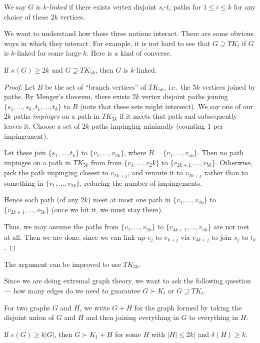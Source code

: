\documentclass[a4paper]{article}
\begin{document}
\begin{defi}
  We say $G$ is \emph{$k$-linked} if there exists vertex disjoint $s_i$-$t_i$ paths for $1 \leq i \leq k$ for any choice of these $2k$ vertices.
\end{defi}

We want to understand how these three notions interact. There are some obvious ways in which they interact. For example, it is not hard to see that $G \supseteq TK_t$ if $G$ is $k$-linked for some large $k$. Here is a kind of converse.
\begin{lemma}
  If $\kappa(G) \geq 2k$ and $G \supseteq TK_{5k}$, then $G$ is $k$-linked.
\end{lemma}

\begin{proof}
  Let $B$ be the set of ``branch vertices'' of $TK_{5k}$, i.e.\ the $5k$ vertices joined by paths. By Menger's theorem, there exists $2k$ vertex disjoint paths joining $\{s_1, \ldots, s_k, t_1, \ldots, t_k\}$ to $B$ (note that these sets might intersect). We say one of our $2k$ paths \emph{impinges} on a path in $TK_{5k}$ if it meets that path and subsequently leaves it. Choose a set of $2k$ paths impinging minimally (counting 1 per impingement).

  Let these join $\{s_1, \ldots, t_k\}$ to $\{v_1, \ldots, v_{2k}\}$, where $B = \{v_1, \ldots, v_{5k}\}$. Then no path impinges on a path in $TK_{5k}$ from from $\{v_1, \ldots, v_2k\}$ to $\{v_{2k + 1}, \ldots, v_{5k}\}$. Otherwise, pick the path impinging closest to $v_{2k + j}$, and reroute it to $v_{2k + j}$ rather than to something in $\{v_1, \ldots, v_{2k}\}$, reducing the number of impingements.

  Hence each path (of any $2k$) meet at most one path in $\{v_1, \ldots, v_{2k}\}$ to $\{v_{2k + 1}, \ldots, v_{5k}\}$ (once we hit it, we must stay there).

  Thus, we may assume the paths from $\{v_1, \ldots, v_{2k}\}$ to $\{v_{4k + 1}, \ldots, v_{5k}\}$ are not met at all. Then we are done, since we can link up $v_j$ to $v_{k + j}$ via $v_{4k + j}$ to join $s_j$ to $t_k$.
\end{proof}
The argument can be improved to use $TK_{3k}$.

Since we are doing extremal graph theory, we want to ask the following question --- how many edges do we need to guarantee $G \succ K_t$ or $G \supseteq TK_t$.

For two graphs $G$ and $H$, we write $G + H$ for the graph formed by taking the disjoint union of $G$ and $H$ and then joining everything in $G$ to everything in $H$.
\begin{lemma}
  If $e(G) \geq k|G|$, then $G \succ K_1 + H$ for some $H$ with $|H| \leq 2k|$ and $\delta(H) \geq k$.
\end{lemma}
\end{document}
